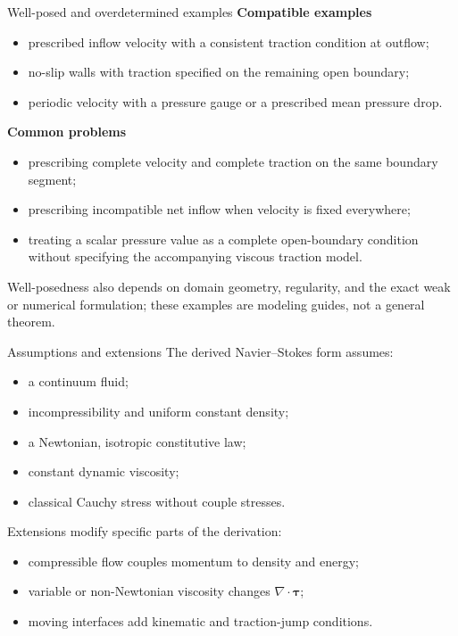 \documentclass[aspectratio=169,11pt]{beamer}
\newcommand{\taustress}{\bm{\tau}}
\begin{document}
\begin{frame}{Well-posed and overdetermined examples}
\small
\textbf{Compatible examples}
\begin{itemize}\itemsep4pt
  \item prescribed inflow velocity with a consistent traction condition at outflow;
  \item no-slip walls with traction specified on the remaining open boundary;
  \item periodic velocity with a pressure gauge or a prescribed mean pressure drop.
\end{itemize}

\medskip
\textbf{Common problems}
\begin{itemize}\itemsep4pt
  \item prescribing complete velocity and complete traction on the same boundary segment;
  \item prescribing incompatible net inflow when velocity is fixed everywhere;
  \item treating a scalar pressure value as a complete open-boundary condition without specifying the accompanying viscous traction model.
\end{itemize}
\begin{punchbox}
\small Well-posedness also depends on domain geometry, regularity, and the exact weak or numerical formulation; these examples are modeling guides, not a general theorem.
\end{punchbox}
\end{frame}

\begin{frame}{Assumptions and extensions}
The derived Navier--Stokes form assumes:
\begin{itemize}\itemsep5pt
  \item a continuum fluid;
  \item incompressibility and uniform constant density;
  \item a Newtonian, isotropic constitutive law;
  \item constant dynamic viscosity;
  \item classical Cauchy stress without couple stresses.
\end{itemize}

Extensions modify specific parts of the derivation:
\begin{itemize}\itemsep4pt
  \item compressible flow couples momentum to density and energy;
  \item variable or non-Newtonian viscosity changes $\nabla\cdot\taustress$;
  \item moving interfaces add kinematic and traction-jump conditions.
\end{itemize}
\end{frame}
\end{document}
